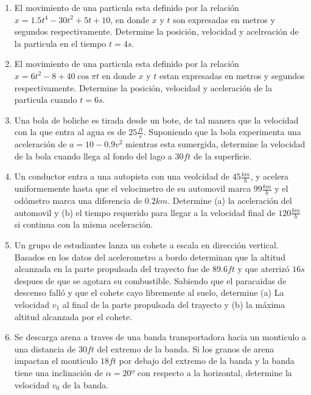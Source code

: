 \begin{enumerate}

	\item El movimiento de una particula esta definido por la relación $x = 1.5t^4 - 30t^2 + 5t + 10$, en donde $x$ y $t$ son expresadas en metros y segundos respectivamente. Determine la posición, velocidad y acelreación de la particula en el tiempo $t = 4s$.

	\item El movimiento de una particula esta definido por la relación $x = 6t^2 - 8 + 40\cos{\pi t}$ en donde $x$ y $t$ estan expresadas en metros y segundos respectivamente. Determine la posición, velocidad y aceleración de la particula cuando $t = 6s$.

	\item Una bola de boliche es tirada desde un bote, de tal manera que la velocidad con la que entra al agua es de $25 \frac{ft}{s}$. Suponiendo que la bola experimenta una aceleración de $a = 10 - 0.9v^2$ mientras esta sumergida, determine la velocidad de la bola cuando llega al fondo del lago a $30 ft$ de la superficie.

	\item Un conductor entra a una autopista con una veolcidad de $45 \frac{km}{h}$, y acelera uniformemente hasta que el velocimetro de su automovil marca $99 \frac{km}{h}$ y el odómetro marca una diferencia de $0.2 km$. Determine (a) la aceleración del automovil y (b) el tiempo requerido para llegar a la velocidad final de $120 \frac{km}{h}$ si continua con la misma aceleración.

	\item Un grupo de estudiantes lanza un cohete a escala en dirección vertical. Basados en los datos del acelerometro a bordo determinan que la altitud alcanzada en la parte propulsada del trayecto fue de $89.6ft$ y que aterrizó $16s$ despues de que se agotara su combustible. Sabiendo que el paracaidas de descenso falló y que el cohete cayo libremente al suelo, determine (a) La velocidad $v_1$ al final de la parte propulsada del trayecto y (b) la máxima altitud alcanzada por el cohete.

	\item Se descarga arena a traves de una banda transportadora hacia un monticulo a una distancia de $30 ft$ del extremo de la banda. Si los granos de arena impactan el monticulo $18 ft$ por debajo del extremo de la banda y la banda tiene una inclinación de $\alpha = 20º$ con respecto a la horizontal, determine la velocidad $v_0$ de la banda.


\end{enumerate}
